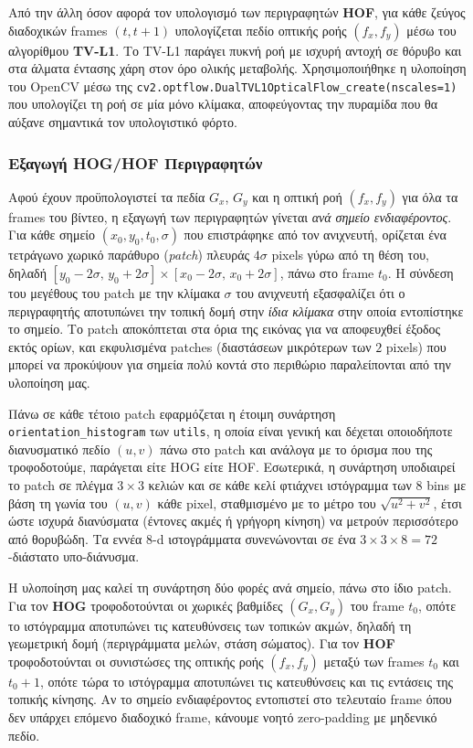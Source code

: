 \documentclass[12pt, a4paper]{article}
\begin{document}
Από την άλλη όσον αφορά τον υπολογισμό των περιγραφητών \textbf{HOF}, για κάθε ζεύγος διαδοχικών frames $(t, t{+}1)$ υπολογίζεται πεδίο οπτικής ροής
$(f_x, f_y)$ μέσω του αλγορίθμου \textbf{TV-L1}. Το TV-L1 παράγει πυκνή ροή
με ισχυρή αντοχή σε θόρυβο και στα άλματα έντασης χάρη στον όρο ολικής
μεταβολής. Χρησιμοποιήθηκε η υλοποίηση του OpenCV μέσω της \texttt{cv2.optflow.DualTVL1OpticalFlow\_create(nscales=1)} που υπολογίζει τη ροή σε μία μόνο κλίμακα, αποφεύγοντας την πυραμίδα που θα αύξανε σημαντικά τον υπολογιστικό φόρτο.

\subsubsection{Εξαγωγή HOG/HOF Περιγραφητών}

Αφού έχουν προϋπολογιστεί τα πεδία $G_x$, $G_y$ και η οπτική ροή
$(f_x, f_y)$ για όλα τα frames του βίντεο, η εξαγωγή των περιγραφητών
γίνεται \emph{ανά σημείο ενδιαφέροντος}. Για κάθε σημείο
$(x_0, y_0, t_0, \sigma)$ που επιστράφηκε από τον ανιχνευτή, ορίζεται ένα
τετράγωνο χωρικό παράθυρο (\emph{patch}) πλευράς $4\sigma$ pixels γύρω από
τη θέση του, δηλαδή
$[y_0 - 2\sigma,\, y_0 + 2\sigma] \times [x_0 - 2\sigma,\, x_0 + 2\sigma]$,
πάνω στο frame $t_0$. Η σύνδεση του μεγέθους του patch με την κλίμακα
$\sigma$ του ανιχνευτή εξασφαλίζει ότι ο περιγραφητής αποτυπώνει την
τοπική δομή στην \emph{ίδια κλίμακα} στην οποία εντοπίστηκε το σημείο.
Το patch αποκόπτεται στα όρια της εικόνας για να αποφευχθεί έξοδος εκτός
ορίων, και εκφυλισμένα patches (διαστάσεων μικρότερων των $2$ pixels) που
μπορεί να προκύψουν για σημεία πολύ κοντά στο περιθώριο παραλείπονται από την υλοποίηση μας.

Πάνω σε κάθε τέτοιο patch εφαρμόζεται η έτοιμη συνάρτηση
\texttt{orientation\_histogram} των \texttt{utils}, η οποία είναι
γενική και δέχεται οποιοδήποτε διανυσματικό πεδίο $(u, v)$ πάνω στο
patch και ανάλογα με το όρισμα που της τροφοδοτούμε, παράγεται είτε HOG είτε HOF.
Εσωτερικά, η συνάρτηση υποδιαιρεί το patch σε πλέγμα $3\times 3$ κελιών
και σε κάθε κελί φτιάχνει ιστόγραμμα των $8$ bins με βάση τη γωνία του
$(u, v)$ κάθε pixel, σταθμισμένο με το μέτρο του $\sqrt{u^2+v^2}$, έτσι ώστε ισχυρά διανύσματα (έντονες ακμές ή γρήγορη κίνηση) να
μετρούν περισσότερο από θορυβώδη. Τα εννέα $8$-d ιστογράμματα
συνενώνονται σε ένα $3\!\times\!3\!\times\!8 = 72$-διάστατο υπο-διάνυσμα.

Η υλοποίηση μας καλεί τη συνάρτηση δύο φορές ανά σημείο, πάνω στο ίδιο
patch. Για τον \textbf{HOG} τροφοδοτούνται οι χωρικές βαθμίδες
$(G_x, G_y)$ του frame $t_0$, οπότε το ιστόγραμμα αποτυπώνει τις
κατευθύνσεις των τοπικών ακμών, δηλαδή τη γεωμετρική δομή (περιγράμματα
μελών, στάση σώματος). Για τον \textbf{HOF} τροφοδοτούνται οι
συνιστώσες της οπτικής ροής $(f_x, f_y)$ μεταξύ των frames $t_0$ και
$t_0{+}1$, οπότε τώρα το ιστόγραμμα αποτυπώνει τις κατευθύνσεις και τις
εντάσεις της τοπικής κίνησης. Αν το σημείο ενδιαφέροντος εντοπιστεί
στο τελευταίο frame όπου δεν υπάρχει επόμενο διαδοχικό frame, κάνουμε νοητό zero-padding με μηδενικό πεδίο.
\end{document}

